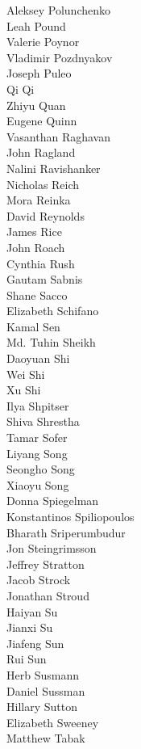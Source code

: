 Aleksey Polunchenko\\
Leah Pound\\
Valerie Poynor\\
Vladimir Pozdnyakov\\
Joseph Puleo\\
Qi Qi\\
Zhiyu Quan\\
Eugene Quinn\\
Vasanthan Raghavan\\
John Ragland\\
Nalini Ravishanker\\
Nicholas Reich\\
Mora Reinka\\
David Reynolds\\
James Rice\\
John Roach\\
Cynthia Rush\\
Gautam Sabnis\\
Shane Sacco\\
Elizabeth Schifano\\
Kamal Sen\\
Md. Tuhin Sheikh\\
Daoyuan Shi\\
Wei Shi\\
Xu Shi\\
Ilya Shpitser\\
Shiva Shrestha\\
Tamar Sofer\\
Liyang Song\\
Seongho Song\\
Xiaoyu Song\\
Donna Spiegelman\\
Konstantinos Spiliopoulos\\
Bharath Sriperumbudur\\
Jon Steingrimsson\\
Jeffrey Stratton\\
Jacob Strock\\
Jonathan Stroud\\
Haiyan Su\\
Jianxi Su\\
Jiafeng Sun\\
Rui Sun\\
Herb Susmann\\
Daniel Sussman\\
Hillary Sutton\\
Elizabeth Sweeney\\
Matthew Tabak\\
